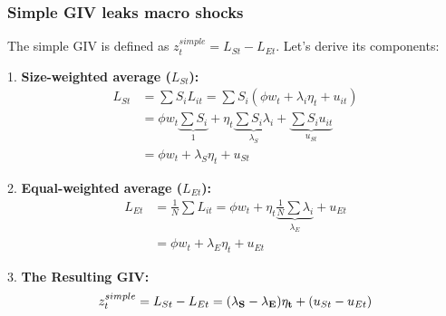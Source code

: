 \documentclass[aspectratio=169,11pt]{beamer}
\begin{document}
\begin{frame} \label{app_simple_giv_fails}
    \frametitle{Simple GIV leaks macro shocks}
    The simple GIV is defined as $z_t^{simple} = L_{St} - L_{Et}$. Let's derive its components:

    1. \textbf{Size-weighted average ($L_{St}$):}
    \begin{align*}
        L_{St} & = \sum S_i L_{it} = \sum S_i (\phi w_t + \lambda_i \eta_t + u_{it})                                                               \\
               & = \phi w_t \underbrace{\sum S_i}_{1} + \eta_t \underbrace{\sum S_i \lambda_i}_{\lambda_S} + \underbrace{\sum S_i u_{it}}_{u_{St}} \\
               & = \phi w_t + \lambda_S \eta_t + u_{St}
    \end{align*}

    2. \textbf{Equal-weighted average ($L_{Et}$):}
    \begin{align*}
        L_{Et} & = \frac{1}{N} \sum L_{it} = \phi w_t + \eta_t \underbrace{\frac{1}{N} \sum \lambda_i}_{\lambda_E} + u_{Et} \\
               & = \phi w_t + \lambda_E \eta_t + u_{Et}
    \end{align*}

    3. \textbf{The Resulting GIV:} \hyperlink{src_simple_giv_fails}{}
    \begin{equation}
        z_t^{simple} = L_{St} - L_{Et} = \mathbf{(\lambda_S - \lambda_E) \eta_t} + (u_{St} - u_{Et}) \notag
    \end{equation}

    \vspace{0.1cm}
    \hfill \hyperlink{src_simple_giv_fails}{}
\end{frame}
\end{document}
